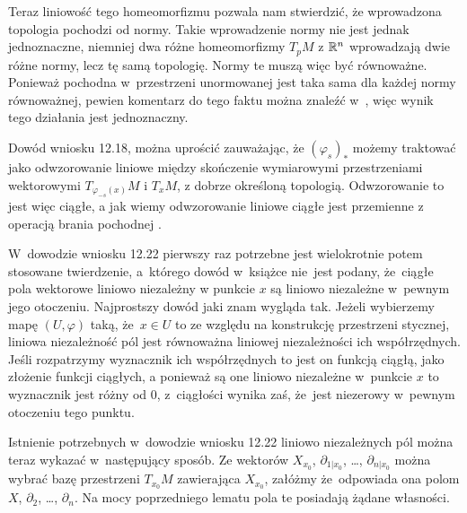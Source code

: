 \documentclass[a4paper,11pt]{article}
\begin{document}
Teraz liniowość tego homeomorfizmu pozwala nam stwierdzić, że
wprowadzona topologia pochodzi od normy. Takie wprowadzenie normy nie
jest jednak jednoznaczne, niemniej dwa różne homeomorfizmy $T_{ p }M$
z $\mathbb{R}^{ n }$ wprowadzają dwie różne normy, lecz tę samą
topologię. Normy te muszą więc być równoważne. Ponieważ pochodna w~przestrzeni unormowanej jest taka sama dla każdej normy równoważnej,
pewien komentarz do tego faktu można znaleźć
w~\cite{SchwartzKursAnalizyMatematycznejVolI1979}, więc
wynik tego działania jest jednoznaczny.

\vspace{\spaceFour}



 Dowód wniosku 12.18, można uprościć zauważając, że
$( \varphi_{ s } )_{ * }$ możemy traktować jako odwzorowanie
liniowe między skończenie wymiarowymi przestrzeniami wektorowymi
$T_{ \varphi_{ -s }( x ) }M$ i $T_{ x }M$, z dobrze określoną
topologią. Odwzorowanie to jest więc ciągłe, a jak wiemy
odwzorowanie liniowe ciągłe jest przemienne z operacją brania
pochodnej \cite{LSKAMI}.

\vspace{\spaceFour}



\start {} W~dowodzie wniosku 12.22 pierwszy raz potrzebne jest
wielokrotnie potem stosowane twierdzenie, a~którego dowód w~książce
nie~jest podany, że~ciągłe pola wektorowe liniowo niezależny w punkcie
$x$ są liniowo niezależne w~pewnym jego otoczeniu. Najprostszy dowód
jaki znam wygląda tak. Jeżeli wybierzemy mapę $( U, \varphi )$ taką,
że~$x \in U$ to ze względu na konstrukcję przestrzeni stycznej,
liniowa niezależność pól jest równoważna liniowej niezależności ich
współrzędnych. Jeśli rozpatrzymy wyznacznik ich współrzędnych to jest
on funkcją ciągłą, jako złożenie funkcji ciągłych, a ponieważ są one
liniowo niezależne w~punkcie $x$ to wyznacznik jest różny od 0,
z~ciągłości wynika zaś, że~jest niezerowy w~pewnym otoczeniu tego
punktu.

\vspace{\spaceFour}



\start {} Istnienie potrzebnych w~dowodzie wniosku 12.22
liniowo niezależnych pól można teraz wykazać w~następujący sposób. Ze
wektorów $X_{ x_{ 0 } }$, $\partial_{ 1 | { x_{ 0 } } }$, \ldots,
$\partial_{ n | { x_{ 0 } } }$ można wybrać bazę przestrzeni
$T_{ { x_{ 0 } } }M$ zawierająca $X_{ { x_{ 0 } } }$, załóżmy
że~odpowiada ona polom $X$, $\partial_{ 2 }$, \ldots,
$\partial_{ n }$. Na mocy poprzedniego lematu pola te posiadają żądane
własności.
\end{document}
